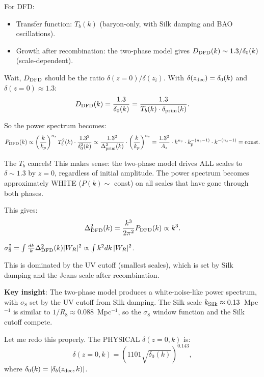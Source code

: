 \documentclass[11pt]{article}
\newcommand{\kSilk}{k_{\rm Silk}}
\begin{document}
For DFD:
\begin{itemize}
\item Transfer function: $T_b(k)$ (baryon-only, with Silk damping
  and BAO oscillations).
\item Growth after recombination: the two-phase model gives
  $D_{\rm DFD}(k) \sim 1.3/\delta_0(k)$ (scale-dependent).
\end{itemize}

Wait, $D_{\rm DFD}$ should be the ratio $\delta(z=0)/\delta(z_i)$.
With $\delta(z_{\rm dec}) = \delta_0(k)$ and $\delta(z=0) \approx 1.3$:
\begin{equation}
D_{\rm DFD}(k) = \frac{1.3}{\delta_0(k)} = \frac{1.3}{T_b(k)\cdot\delta_{\rm prim}(k)}.
\end{equation}

So the power spectrum becomes:
\begin{equation}
P_{\rm DFD}(k) \propto \left(\frac{k}{k_p}\right)^{n_s}T_b^2(k)
\cdot\frac{1.3^2}{\delta_0^2(k)}
\propto \frac{1.3^2}{\Delta_{\rm prim}^2(k)}\cdot
\left(\frac{k}{k_p}\right)^{n_s} = \frac{1.3^2}{A_s}\cdot k^{n_s}
\cdot k_p^{-(n_s-1)}\cdot k^{-(n_s-1)} = \text{const}.
\end{equation}

The $T_b$ cancels! This makes sense: the two-phase model drives
ALL scales to $\delta \sim 1.3$ by $z = 0$, regardless of initial
amplitude. The power spectrum becomes approximately WHITE ($P(k)
\sim$ const) on all scales that have gone through both phases.

This gives:
\begin{equation}
\Delta^2_{\rm DFD}(k) = \frac{k^3}{2\pi^2}P_{\rm DFD}(k) \propto k^3.
\end{equation}

$\sigma_8^2 = \int \frac{dk}{k}\Delta^2_{\rm DFD}(k)|W_R|^2
\propto \int k^2 dk\,|W_R|^2$.

This is dominated by the UV cutoff (smallest scales), which is
set by Silk damping and the Jeans scale after recombination.

\textbf{Key insight}: The two-phase model produces a white-noise-like
power spectrum, with $\sigma_8$ set by the UV cutoff from Silk
damping. The Silk scale $\kSilk \approx 0.13$~Mpc$^{-1}$ is
similar to $1/R_{8} \approx 0.088$~Mpc$^{-1}$, so the $\sigma_8$
window function and the Silk cutoff compete.

Let me redo this properly. The PHYSICAL $\delta(z=0, k)$ is:
\begin{equation}
\delta(z=0, k) = (1101\sqrt{\delta_0(k)})^{0.143},
\end{equation}
where $\delta_0(k) = |\delta_b(z_{\rm dec}, k)|$.
\end{document}
